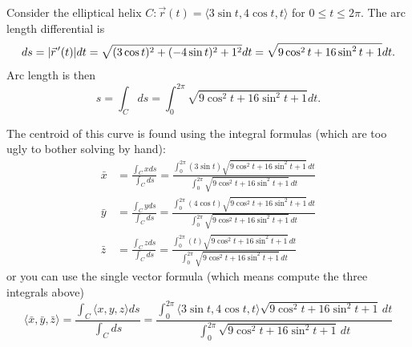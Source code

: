 Consider the elliptical helix $C\colon\vec r (t) = \langle3\sin t, 4\cos t,
t\rangle$ for $0\leq t\leq 2\pi$.  The arc length differential is $$ds = |\vec
r^{\,\prime}(t)|dt = \sqrt{(3\cos t)^2 + (-4\sin t)^2+1^2}dt = \sqrt{9\cos^2
t+16\sin^2 t+1}dt.$$ Arc length is then  $$s=\int_C ds =
\int_{0}^{2\pi}\sqrt{9\cos^2 t+16\sin^2 t+1}dt.$$

The centroid of this curve is found using the integral formulas (which
are too ugly to bother solving by hand):
\begin{align*}
\bar x &= \frac{\int_C x ds}{\int_C ds} = \frac{\int_{0}^{2\pi}(3\sin
t)\sqrt{9\cos^2 t+16\sin^2 t+1}\,dt}{\int_{0}^{2\pi}\sqrt{9\cos^2 t+16\sin^2
t+1}\,dt}\\
\bar y &= \frac{\int_C y ds}{\int_C ds} = \frac{\int_{0}^{2\pi}(4\cos
t)\sqrt{9\cos^2 t+16\sin^2 t+1}\,dt}{\int_{0}^{2\pi}\sqrt{9\cos^2 t+16\sin^2
t+1}\,dt}\\
\bar z &= \frac{\int_C z ds}{\int_C ds} = \frac{\int_{0}^{2\pi}(t)\sqrt{9\cos^2
t+16\sin^2 t+1}\,dt}{\int_{0}^{2\pi}\sqrt{9\cos^2 t+16\sin^2 t+1}\,dt}
\end{align*}
or you can use the single vector formula (which means compute the
three integrals above) 
$$\langle\bar x,\bar y,\bar z\rangle = \frac{\int_C \langle x,y,z\rangle
ds}{\int_C ds} = \frac{\int_{0}^{2\pi} \langle3\sin t, 4\cos t,
t\rangle\sqrt{9\cos^2 t+16\sin^2 t+1}\,dt}{\int_{0}^{2\pi}\sqrt{9\cos^2
t+16\sin^2 t+1}\,dt}$$


